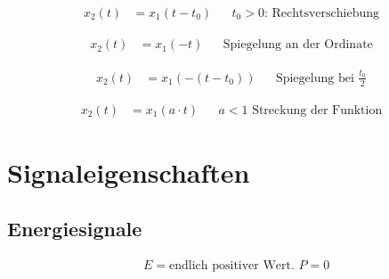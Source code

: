 \begin{boxleft}
\end{boxleft}\begin{boxrightshaded}
\begin{align*}
x_2\left(t\right)&= x_1\left(t-t_0\right)&&\text{$t_0>0$: Rechtsverschiebung}
\end{align*}
\end{boxrightshaded}

\begin{boxleft}
\end{boxleft}\begin{boxrightshaded}
\begin{align*}
x_2\left(t\right)&= x_1\left(-t\right)&&\text{Spiegelung an der Ordinate}
\end{align*}
\end{boxrightshaded}


\begin{boxleft}
\end{boxleft}\begin{boxrightshaded}
\begin{align*}
x_2\left(t\right)&= x_1\left(-\left(t-t_0\right)\right)&&\text{Spiegelung bei $\frac{t_0}{2}$}
\end{align*}
\end{boxrightshaded}


\begin{boxleft}
\end{boxleft}\begin{boxrightshaded}
\begin{align*}
x_2\left(t\right)&= x_1\left(a\cdot t\right)&&\text{$a<1$ Streckung der Funktion}
\end{align*}
\end{boxrightshaded}



\section{Signaleigenschaften}

\subsection{Energiesignale}

\begin{boxshaded}
\begin{align*}
&\text{$E=$endlich positiver Wert. $P=0$} 
\end{align*}
\end{boxshaded}


